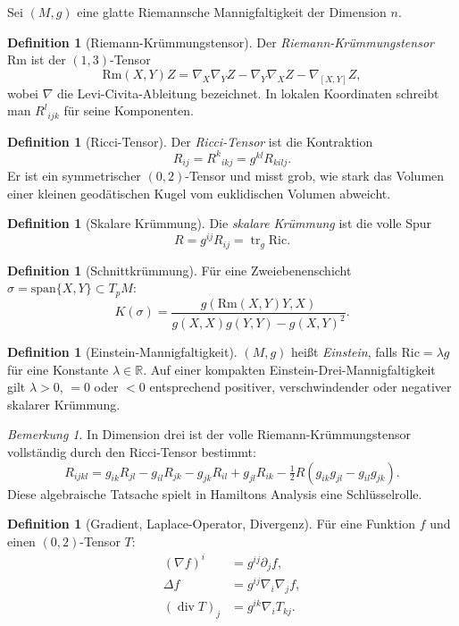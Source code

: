 \documentclass[12pt,a4paper]{amsart}
\theoremstyle{definition}
\newtheorem{definition}[theorem]{Definition}
\theoremstyle{remark}
\newtheorem{bemerkung}[theorem]{Bemerkung}
\newcommand{\R}{\mathbb{R}}
\newcommand{\Ric}{\mathrm{Ric}}
\newcommand{\Rm}{\mathrm{Rm}}
\DeclareMathOperator{\tr}{tr}
\DeclareMathOperator{\divop}{div}
\begin{document}
Sei $(M,g)$ eine glatte Riemannsche Mannigfaltigkeit der Dimension $n$.

\begin{definition}[Riemann-Krümmungstensor]
Der \emph{Riemann-Krümmungstensor} $\Rm$ ist der $(1,3)$-Tensor
\[
  \Rm(X,Y)Z = \nabla_X\nabla_Y Z - \nabla_Y\nabla_X Z - \nabla_{[X,Y]}Z,
\]
wobei $\nabla$ die Levi-Civita-Ableitung bezeichnet.  In lokalen
Koordinaten schreibt man $R^l{}_{ijk}$ für seine Komponenten.
\end{definition}

\begin{definition}[Ricci-Tensor]
Der \emph{Ricci-Tensor} ist die Kontraktion
\[
  R_{ij} = R^k{}_{ikj} = g^{kl}R_{kilj}.
\]
Er ist ein symmetrischer $(0,2)$-Tensor und misst grob, wie stark das Volumen
einer kleinen geodätischen Kugel vom euklidischen Volumen abweicht.
\end{definition}

\begin{definition}[Skalare Krümmung]
Die \emph{skalare Krümmung} ist die volle Spur
\[
  R = g^{ij}R_{ij} = \tr_g \Ric.
\]
\end{definition}

\begin{definition}[Schnittkrümmung]
Für eine Zweiebenenschicht $\sigma = \mathrm{span}\{X,Y\} \subset T_pM$:
\[
  K(\sigma) = \frac{g(\Rm(X,Y)Y,X)}{g(X,X)g(Y,Y)-g(X,Y)^2}.
\]
\end{definition}

\begin{definition}[Einstein-Mannigfaltigkeit]
$(M,g)$ heißt \emph{Einstein}, falls $\Ric = \lambda g$ für eine Konstante
$\lambda \in \R$.  Auf einer kompakten Einstein-Drei-Mannigfaltigkeit gilt
$\lambda > 0$, $= 0$ oder $< 0$ entsprechend positiver, verschwindender
oder negativer skalarer Krümmung.
\end{definition}

\begin{bemerkung}
In Dimension drei ist der volle Riemann-Krümmungstensor vollständig durch den
Ricci-Tensor bestimmt:
\[
  R_{ijkl} = g_{ik}R_{jl} - g_{il}R_{jk} - g_{jk}R_{il} + g_{jl}R_{ik}
             - \tfrac{1}{2}R(g_{ik}g_{jl} - g_{il}g_{jk}).
\]
Diese algebraische Tatsache spielt in Hamiltons Analysis eine Schlüsselrolle.
\end{bemerkung}

\begin{definition}[Gradient, Laplace-Operator, Divergenz]
Für eine Funktion $f$ und einen $(0,2)$-Tensor $T$:
\begin{align*}
  (\nabla f)^i &= g^{ij}\partial_j f, \\
  \Delta f &= g^{ij}\nabla_i\nabla_j f, \\
  (\divop T)_j &= g^{ik}\nabla_i T_{kj}.
\end{align*}
\end{definition}
\end{document}
